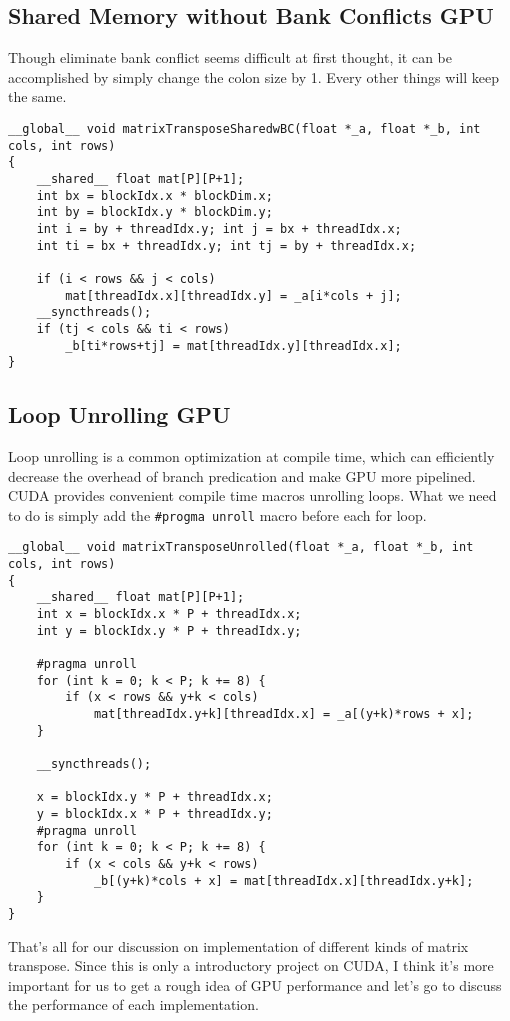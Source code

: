 \documentclass{article}
\begin{document}
\subsection{Shared Memory without Bank Conflicts GPU}
Though eliminate bank conflict seems difficult at first thought, it can be accomplished by simply change the colon size by 1. Every other things will keep the same.
\begin{lstlisting}[caption=Shared Memory without Bank Conflicts GPU]
__global__ void matrixTransposeSharedwBC(float *_a, float *_b, int cols, int rows)
{
	__shared__ float mat[P][P+1];
	int bx = blockIdx.x * blockDim.x;
	int by = blockIdx.y * blockDim.y;
	int i = by + threadIdx.y; int j = bx + threadIdx.x;
	int ti = bx + threadIdx.y; int tj = by + threadIdx.x;
	
	if (i < rows && j < cols)
		mat[threadIdx.x][threadIdx.y] = _a[i*cols + j];
	__syncthreads();
	if (tj < cols && ti < rows)
		_b[ti*rows+tj] = mat[threadIdx.y][threadIdx.x];
}
\end{lstlisting}

\subsection{Loop Unrolling GPU}
Loop unrolling is a common optimization at compile time, which can efficiently decrease the overhead of branch predication and make GPU more pipelined. CUDA provides convenient compile time macros unrolling loops. What we need to do is simply add the \verb|#progma unroll| macro before each for loop.
\begin{lstlisting}[caption=Loop Unrolling GPU]
__global__ void matrixTransposeUnrolled(float *_a, float *_b, int cols, int rows)
{
	__shared__ float mat[P][P+1];
	int x = blockIdx.x * P + threadIdx.x;
	int y = blockIdx.y * P + threadIdx.y;
	
	#pragma unroll
	for (int k = 0; k < P; k += 8) {
		if (x < rows && y+k < cols)
			mat[threadIdx.y+k][threadIdx.x] = _a[(y+k)*rows + x];
	}
	
	__syncthreads();
	
	x = blockIdx.y * P + threadIdx.x;
	y = blockIdx.x * P + threadIdx.y;
	#pragma unroll
	for (int k = 0; k < P; k += 8) {
		if (x < cols && y+k < rows)
			_b[(y+k)*cols + x] = mat[threadIdx.x][threadIdx.y+k];
	}
}
\end{lstlisting}


That's all for our discussion on implementation of different kinds of matrix transpose. Since this is only a introductory project on CUDA, I think it's more important for us to get a rough idea of GPU performance and let's go to discuss the performance of each implementation.
\end{document}
